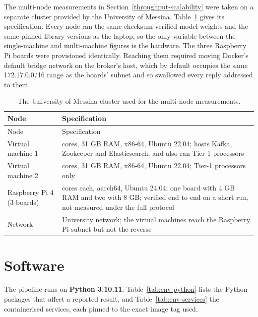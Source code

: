 The multi-node measurements in Section~\ref{throughput-scalability} were taken on a separate cluster provided by the University of Messina. Table~\ref{tab:env-cluster} gives its specification. Every node ran the same checksum-verified model weights and the same pinned library versions as the laptop, so the only variable between the single-machine and multi-machine figures is the hardware. The three Raspberry Pi boards were provisioned identically. Reaching them required moving Docker's default bridge network on the broker's host, which by default occupies the same 172.17.0.0/16 range as the boards' subnet and so swallowed every reply addressed to them.

\begin{longtable}{@{}
  >{\raggedright\arraybackslash}p{}
  >{\raggedright\arraybackslash}p{}@{}}
\caption{The University of Messina cluster used for the multi-node measurements.}\label{tab:env-cluster}\tabularnewline
\toprule
Node & Specification \\
\midrule
\endfirsthead
\toprule
Node & Specification \\
\midrule
\endhead
\bottomrule
\endlastfoot
Virtual machine 1 & 4 cores, 31 GB RAM, x86-64, Ubuntu 22.04; hosts Kafka, Zookeeper and Elasticsearch, and also ran Tier-1 processors \\
Virtual machine 2 & 4 cores, 31 GB RAM, x86-64, Ubuntu 22.04; Tier-1 processors only \\
Raspberry Pi 4 (3 boards) & 4 cores each, aarch64, Ubuntu 24.04; one board with 4 GB RAM and two with 8 GB; verified end to end on a short run, not measured under the full protocol \\
Network & University network; the virtual machines reach the Raspberry Pi subnet but not the reverse \\
\end{longtable}

\section{Software}\label{appendix-software}

The pipeline runs on \textbf{Python 3.10.11}. Table~\ref{tab:env-python} lists the Python packages that affect a reported result, and Table~\ref{tab:env-services} the containerised services, each pinned to the exact image tag used.

